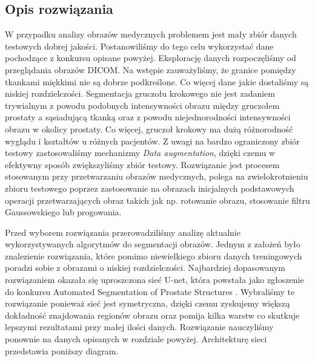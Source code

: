 \documentclass[a4paper,11pt,twoside]{report}
\theoremstyle{definition}
\begin{document}
\subsection{Opis rozwiązania}

W przypadku analizy obrazów medycznych problemem jest mały zbiór danych testowych dobrej jakości. Postanowiliśmy do tego celu wykorzystać dane pochodzące z konkursu opisane powyżej. Eksplorację danych rozpoczęliśmy od przeglądania obrazów DICOM. Na wstępie zauważyliśmy, że granice pomiędzy tkankami miękkimi nie są dobrze podkreślone. Co więcej dane jakie dostaliśmy są niskiej rozdzielczości. Segmentacja gruczołu krokowego nie jest zadaniem trywialnym z powodu podobnych intensywności obrazu między gruczołem prostaty a sąsiadującą tkanką oraz z powodu niejednorodności intensywności obrazu w okolicy prostaty. Co więcej, gruczoł krokowy ma dużą różnorodność wyglądu i kształtów u różnych pacjentów.
Z uwagi na bardzo ograniczony zbiór testowy zastosowaliśmy mechanizmy \textit{Data augmentation}, dzięki czemu w efektywny sposób zwiększyliśmy zbiór testowy. Rozwiązanie jest  procesem stosowanym przy przetwarzaniu obrazów medycznych, polega na zwielokrotnieniu zbioru testowego poprzez zastosowanie na obrazach inicjalnych podstawowych operacji przetwarzających obraz takich jak np. rotowanie obrazu, stosowanie filtru Gaussowskiego lub progowania.
\par
Przed wyborem rozwiązania przerowadziliśmy analizę aktualnie wykorzystywanych algorytmów do segmentacji obrazów. Jednym z założeń było znalezienie rozwiązania, które pomimo niewielkiego zbioru danych treningowych poradzi sobie z obrazami o niskiej rozdzielczości. Najbardziej dopasowanym rozwiązaniem okazała się uproszczona sieć U-net, która powstała jako zgłoszenie do konkursu Automated Segmentation of Prostate Structures \cite{zgloszenie}. Wybraliśmy te rozwiązanie ponieważ sieć jest symetryczna, dzięki czemu zyskujemy większą dokładność znajdowania regionów obrazu oraz pomija kilka warstw co skutkuje lepszymi rezultatami przy małej ilości danych. Rozwiązanie nauczyliśmy ponownie na danych opisanych w rozdziale powyżej. Architekturę sieci przedstawia poniższy diagram. 
\end{document}
